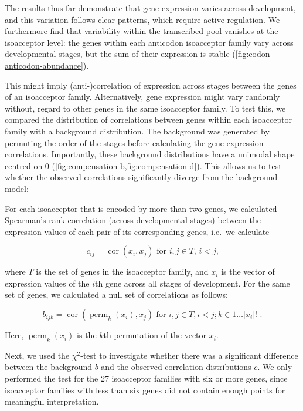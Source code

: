 The results thus far demonstrate that \trna gene expression varies across
development, and this variation follows clear patterns, which require active
regulation. We furthermore find that variability within the transcribed
\trna pool vanishes at the isoacceptor level: the \trna genes within each
anticodon isoacceptor family vary across developmental stages, but the sum of
their expression is stable (\cref{fig:codon-anticodon-abundance}).

This might imply (anti-)correlation of expression across stages between the
genes of an isoacceptor family. Alternatively, \trna gene expression might vary
randomly without, regard to other \trna genes in the same isoacceptor family. To
test this, we compared the distribution of correlations between genes within
each isoacceptor family with a background distribution. The background was
generated by permuting the order of the stages before calculating the \trna gene
expression correlations. Importantly, these background distributions have a
unimodal shape centred on \num{0}
(\cref{fig:compensation-b,fig:compensation-d}). This allows us to test whether
the observed correlations significantly diverge from the background model:

For each isoacceptor that is encoded by more than two \trna genes, we calculated
Spearman’s rank correlation (across developmental stages) between the expression
values of each pair of its corresponding \trna genes, i.e.\ we calculate

\begin{equation}
    c_{ij} = \operatorname{cor}(x_i, x_j) \text{\ for \(i, j \in T\),
        \(i < j\),}
\end{equation}

where \(T\) is the set of \trna genes in the isoacceptor family, and \(x_i\) is
the vector of expression values of the \(i\)th \trna gene across all stages of
development. For the same set of genes, we calculated a null set of correlations
as follows:

\begin{equation}
    b_{ijk} = \operatorname{cor}(\operatorname{perm}_k(x_i), x_j)
        \text{\ for \(i, j \in T, i < j; k \in 1\dots\lvert x_i\rvert!\)\ .}
\end{equation}

Here, \(\operatorname{perm}_k(x_i)\) is the \(k\)th permutation of the vector
\(x_i\).

Next, we used the \(\chi^2\)-test to investigate whether there was a significant
difference between the background \(b\) and the observed correlation
distributions \(c\). We only performed the test for the \num{27} isoacceptor
families with six or more genes, since isoacceptor families with less than six
genes did not contain enough points for meaningful interpretation.

